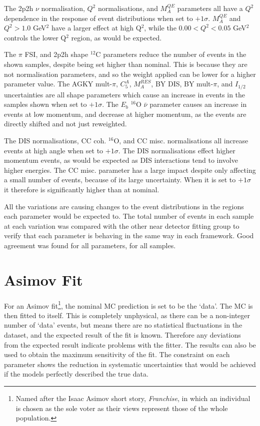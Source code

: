 The 2p2h $\nu$ normalisation, $Q^2$ normalisations, and $M^{QE}_A$ parameters all have a $Q^2$ dependence in the response of event distributions when set to $+1\sigma$. $M^{QE}_A$ and $Q^{2}>1.0$ GeV$^2$ have a larger effect at high Q$^2$, while the $0.00<Q^{2}<0.05$ GeV$^2$ controls the lower Q$^2$ region, as would be expected.

The $\pi$ FSI, and 2p2h shape $^{12}$C parameters reduce the number of events in the shown samples, despite being set higher than nominal. This is because they are not normalisation parameters, and so the weight applied can be lower for a higher parameter value. The AGKY mult-$\pi$, $C^{A}_{5}$, $M^{RES}_{A}$, BY DIS, BY mult-$\pi$, and $I_{1/2}$ uncertainties are all shape parameters which cause an increase in events in the samples shown when set to $+1\sigma$. The $E_{b}$ $^{16}$O $\bar{\nu}$ parameter causes an increase in events at low momentum, and decrease at higher momentum, as the events are directly shifted and not just reweighted.

The DIS normalisations, CC coh. $^{16}$O, and CC misc. normalisations all increase events at high angle when set to $+1\sigma$. The DIS normalisations effect higher momentum events, as would be expected as DIS interactions tend to involve higher energies. The CC misc. parameter has a large impact despite only affecting a small number of events, because of its large uncertainty. When it is set to $+1\sigma$ it therefore is significantly higher than at nominal.

All the variations are causing changes to the event distributions in the regions each parameter would be expected to. The total number of events in each sample at each variation was compared with the other near detector fitting group to verify that each parameter is behaving in the same way in each framework. Good agreement was found for all parameters, for all samples.

\section{Asimov Fit}\label{sec:asimov}

For an Asimov fit\footnote{Named after the Isaac Asimov short story, \textit{Franchise}, in which an individual is chosen as the sole voter as their views represent those of the whole population.}, the nominal MC prediction is set to be the `data'. The MC is then fitted to itself. This is completely unphysical, as there can be a non-integer number of `data' events, but means there are no statistical fluctuations in the dataset, and the expected result of the fit is known. Therefore any deviations from the expected result indicate problems with the fitter. The results can also be used to obtain the maximum sensitivity of the fit. The constraint on each parameter shows the reduction in systematic uncertainties that would be achieved if the models perfectly described the true data.


